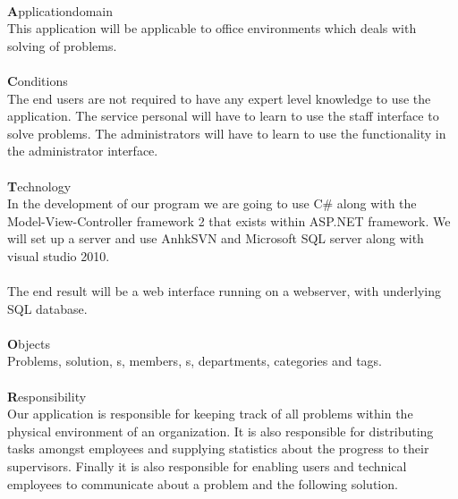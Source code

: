 \ \\
{\Large \textbf{A}}pplicationdomain \\
This application will be applicable to office environments which deals with solving of problems.\\
\ \\
{\Large \textbf{C}}onditions \\ 
The end users are not required to have any expert level knowledge to use the application. The service personal will have to learn to use the staff interface to solve problems. The administrators will have to learn to use the functionality in the administrator interface.   \\
\ \\
{\Large \textbf{T}}echnology \\
In the development of our program we are going to use C\# along with the Model-View-Controller framework 2 that exists within ASP.NET framework. We will set up a server and use AnhkSVN and Microsoft SQL server along with visual studio 2010.\\
\\
The end result will be a web interface running on a webserver, with underlying SQL database.\\
\ \\
{\Large \textbf{O}}bjects \\
Problems, solution, \aclient s, \astaff members, \admin s, departments, categories and tags. \\
\ \\
{\Large \textbf{R}}esponsibility \\
Our application is responsible for keeping track of all problems within the physical environment of an organization. It is also responsible for distributing tasks amongst employees and supplying statistics about the progress to their supervisors. Finally it is also responsible for enabling users and technical employees to communicate about a problem and the following solution.
\ \\ 


